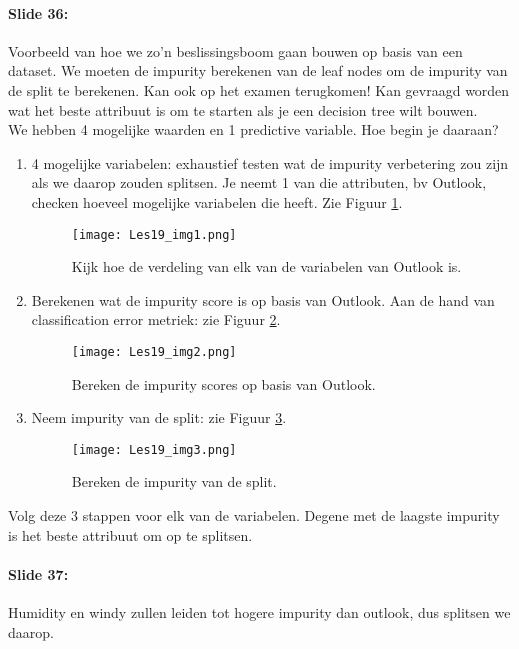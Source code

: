 \documentclass[10pt,a4paper]{report}
\begin{document}
\paragraph{Slide 36:}Voorbeeld van hoe we zo'n beslissingsboom gaan bouwen op basis van een dataset. We moeten de impurity berekenen van de leaf nodes om de impurity van de split te berekenen. Kan ook op het examen terugkomen! Kan gevraagd worden wat het beste attribuut is om te starten als je een decision tree wilt bouwen. \\
We hebben 4 mogelijke waarden en 1 predictive variable. Hoe begin je daaraan?
\begin{enumerate}
\item 4 mogelijke variabelen: exhaustief testen wat de impurity verbetering zou zijn als we daarop zouden splitsen. Je neemt 1 van die attributen, bv Outlook, checken hoeveel mogelijke variabelen die heeft. Zie Figuur \ref{19_1}.

\begin{figure}[ht!]
\centering
\texttt{[image: Les19\_img1.png]}
\caption{Kijk hoe de verdeling van elk van de variabelen van Outlook is. \label{19_1}}
\end{figure}

\item Berekenen wat de impurity score is op basis van Outlook. Aan de hand van classification error metriek: zie Figuur \ref{19_2}.

\begin{figure}[ht!]
\centering
\texttt{[image: Les19\_img2.png]}
\caption{Bereken de impurity scores op basis van Outlook. \label{19_2}}
\end{figure}

\item Neem impurity van de split: zie Figuur \ref{19_3}.

\begin{figure}[ht!]
\centering
\texttt{[image: Les19\_img3.png]}
\caption{Bereken de impurity van de split. \label{19_3}}
\end{figure}

\end{enumerate}
Volg deze 3 stappen voor elk van de variabelen. Degene met de laagste impurity is het beste attribuut om op te splitsen.

\paragraph{Slide 37:}Humidity en windy zullen leiden tot hogere impurity dan outlook, dus splitsen we daarop.
\end{document}
